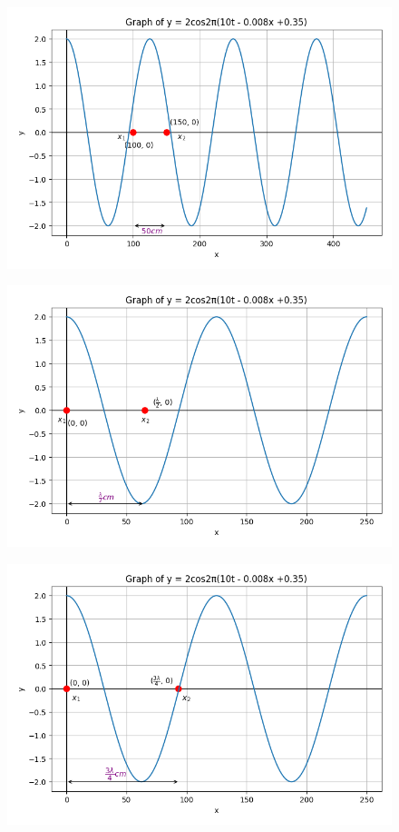 \documentclass[journal,12pt,twocolumn]{IEEEtran}
\theoremstyle{remark}
\begin{document}
\begin{figure}[!h] 
\centering
\includegraphics[width=\columnwidth]{figs/graph2.png}
\captionsetup{justification=centering}
\caption{}
\label{fig:Graph2}
\end{figure}

\begin{figure}[!h] 
\centering
\includegraphics[width=\columnwidth]{figs/graph3.png}
\captionsetup{justification=centering}
\caption{}
\label{fig:Graph3}
\end{figure}

\begin{figure}[!h] 
\centering
\includegraphics[width=\columnwidth]{figs/graph4.png}
\captionsetup{justification=centering}
\caption{}
\label{fig:Graph4}
\end{figure}
\end{document}
